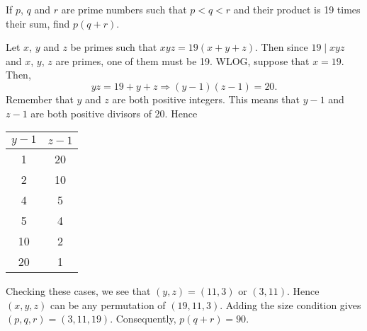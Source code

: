 \begin{question}
    If $p$, $q$ and $r$ are prime numbers such that $p < q < r$ and their
    product is 19 times their sum, find $p(q + r)$.
\end{question}
\begin{solution}
    Let $x$, $y$ and $z$ be primes such that $xyz = 19(x + y + z)$. Then since
    $19 \mid xyz$ and $x$, $y$, $z$ are primes, one of them must be 19. WLOG,
    suppose that $x = 19$. Then,
    \[ yz = 19 + y + z \Longrightarrow (y - 1)(z - 1) = 20. \]
    Remember that $y$ and $z$ are both positive integers. This means that $y -
    1$ and $z - 1$ are both positive divisors of 20. Hence
    \begin{center}
        \begin{tabular}{ |c|c| }
            \hline
            $y - 1$ & $z - 1$ \\
            \hline
            1 & 20 \\
            2 & 10 \\
            4 & 5 \\
            5 & 4 \\
            10 & 2 \\
            20 & 1 \\
            \hline
        \end{tabular}
    \end{center}
    Checking these cases, we see that $(y, z) = (11, 3)$ or $(3, 11)$. Hence
    $(x, y, z)$ can be any permutation of $(19, 11, 3)$. Adding the size
    condition gives $(p, q, r) = (3, 11, 19)$. Consequently, $p(q + r) =
    90$.
\end{solution}
